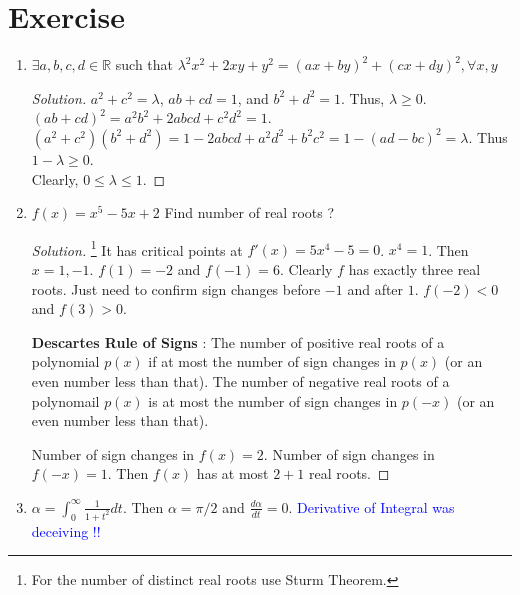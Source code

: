 \section*{Exercise}
\begin{enumerate}
	\item $\exists a,b,c,d \in \mathbb{R}$ such that $\lambda^2 x^2 + 2xy + y^2 = (ax+by)^2 + (cx+dy)^2,\forall x,y$
	\begin{proof}[Solution]
	$a^2+c^2 = \lambda$, $ab+cd = 1$, and
		$b^2+d^2 = 1$.
	Thus, $\lambda \ge 0$.\\
	$(ab+cd)^2 = a^2b^2 + 2abcd + c^2d^2 = 1$. \\
	$(a^2+c^2)(b^2+d^2) = 1-2abcd + a^2d^2 + b^2c^2 = 1-(ad-bc)^2 = \lambda$.
	Thus $1-\lambda \ge 0$.\\
		Clearly, $0 \le \lambda \le 1$.
	\end{proof}
	\item $f(x) = x^5 - 5x + 2$ Find number of real roots ?
	\begin{proof}[Solution]\footnote{For the number of distinct real roots use Sturm Theorem.}
		It has critical points at $f'(x) = 5x^4 - 5 = 0$. $x^4 = 1$.
		Then $x = 1,-1$. $f(1) = -2$ and $f(-1) = 6$. Clearly $f$ has exactly three real roots.
		Just need to confirm sign changes before $-1$ and after $1$.
		$f(-2) < 0$ and $f(3) > 0$.

		\textbf{Descartes Rule of Signs} : The number of positive real roots of a polynomial $p(x)$ if at most the number of sign changes in $p(x)$ (or an even number less than that). The number of negative real roots of a polynomail $p(x)$ is at most the number of sign changes in $p(-x)$ (or an even number less than that). 

		Number of sign changes in $f(x)  = 2$. Number of sign changes in $f(-x) = 1$. Then $f(x)$ has at most $2+1$ real roots.
	\end{proof}
	\item $\alpha = \int_0^\infty \frac{1}{1+t^2} dt$. Then $\alpha = \pi/2$ and $\frac{d\alpha}{dt} = 0$. \textcolor{blue}{Derivative of Integral was deceiving !!}
\end{enumerate}
